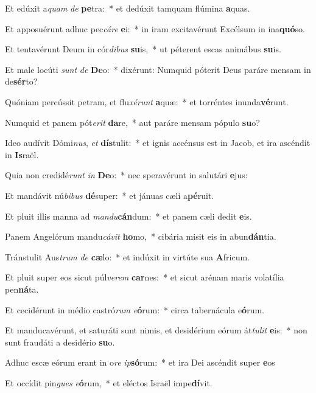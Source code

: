 \item Et edúxit a\textit{quam} \textit{de} \textbf{pe}tra:~* et dedúxit tamquam flúmina \textbf{a}quas.
\item Et apposuérunt adhuc pec\textit{cá}\textit{re} \textbf{e}i:~* in iram excitavérunt Excélsum in ina\textbf{quó}so.
\item Et tentavérunt Deum in cór\textit{di}\textit{bus} \textbf{su}is,~* ut péterent escas animábus \textbf{su}is.
\item Et male locúti \textit{sunt} \textit{de} \textbf{De}o:~* dixérunt: Numquid póterit Deus paráre mensam in de\textbf{sér}to?
\item Quóniam percússit petram, et flu\textit{xé}\textit{runt} \textbf{a}quæ:~* et torréntes inunda\textbf{vé}runt.
\item Numquid et panem pót\textit{e}\textit{rit} \textbf{da}re,~* aut paráre mensam pópulo \textbf{su}o?
\item Ideo audívit Dómi\textit{nus}, \textit{et} \textbf{dís}tulit:~* et ignis accénsus est in Jacob, et ira ascéndit in \textbf{Is}raël.
\item Quia non credidé\textit{runt} \textit{in} \textbf{De}o:~* nec speravérunt in salutári \textbf{e}jus:
\item Et mandávit nú\textit{bi}\textit{bus} \textbf{dé}super:~* et jánuas cæli a\textbf{pé}ruit.
\item Et pluit illis manna ad \textit{man}\textit{du}\textbf{cán}dum:~* et panem cæli dedit \textbf{e}is.
\item Panem Angelórum mandu\textit{cá}\textit{vit} \textbf{ho}mo,~* cibária misit eis in abun\textbf{dán}tia.
\item Tránstulit Aus\textit{trum} \textit{de} \textbf{cæ}lo:~* et indúxit in virtúte sua \textbf{A}fricum.
\item Et pluit super eos sicut púl\textit{ve}\textit{rem} \textbf{car}nes:~* et sicut arénam maris volatília pen\textbf{ná}ta.
\item Et cecidérunt in médio castró\textit{rum} \textit{e}\textbf{ó}rum:~* circa tabernácula e\textbf{ó}rum.
\item Et manducavérunt, et saturáti sunt nimis, et desidérium eórum át\textit{tu}\textit{lit} \textbf{e}is:~* non sunt fraudáti a desidério \textbf{su}o.
\item Adhuc escæ eórum erant in o\textit{re} \textit{ip}\textbf{só}rum:~* et ira Dei ascéndit super \textbf{e}os
\item Et occídit pin\textit{gues} \textit{e}\textbf{ó}rum,~* et eléctos Israël impe\textbf{dí}vit.
